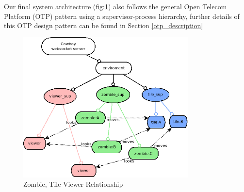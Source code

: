 Our final system architecture (fig:\ref{fig:Zombie, Tile-Viewer Relationship}) also follows the general Open Telecom Platform (OTP) pattern using a supervisor-process hierarchy, further details of this OTP design pattern can be found in Section \ref{otp_description}
\begin{figure}[h]
  \centering
  \includegraphics[width=0.8\textwidth]{img/system.png}
\caption{Zombie, Tile-Viewer Relationship}
    \label{fig:Zombie, Tile-Viewer Relationship}
\end{figure}

\clearpage
\endinput
